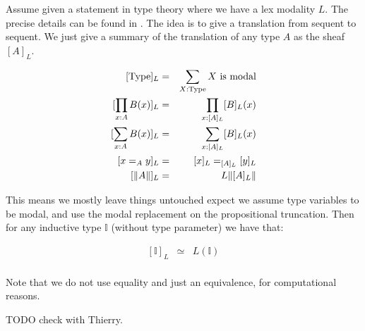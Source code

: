 Assume given a statement in type theory where we have a lex modality $L$. The precise details can be found in . The idea is to give a translation from sequent to sequent. We just give a summary of the translation of any type $A$ as the sheaf $[A]_L$.

\begin{eqnarray}
{[\mathrm{Type}]_L} &=& \sum_{X:\mathrm{Type}} X\ \mathrm{is\ modal}\\
{[\prod_{x:A}B(x)]_L} &=& \prod_{x:[A]_L}[B]_L(x)\\
{[\sum_{x:A}B(x)]_L} &=& \sum_{x:[A]_L}[B]_L(x)\\
{[x=_Ay]_L} &=& [x]_L=_{[A]_L}[y]_L\\
{[\propTrunc{A}]_L} &=& L\propTrunc{[A]_L}
\end{eqnarray}

This means we mostly leave things untouched expect we assume type variables to be modal, and use the modal replacement on the propositional truncation. Then for any inductive type $\mathbb{I}$ (without type parameter) we have that:

\begin{eqnarray}
{[\mathbb{I}]_L} &\simeq& L(\mathbb{I})\\
\end{eqnarray}

Note that we do not use equality and just an equivalence, for computational reasons.

TODO check with Thierry.

